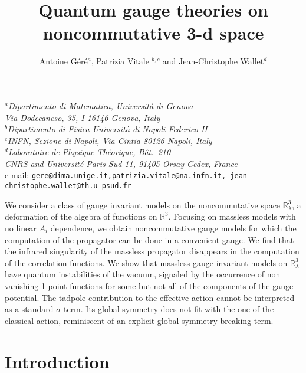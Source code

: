 \documentclass[a4paper,11pt]{article}
\title{Quantum gauge theories on noncommutative 3-d space}
\author{Antoine G\'er\'e$^a$, Patrizia Vitale $^{b,c}$ and Jean-Christophe Wallet$^d$}
\numberwithin{equation}{section}
\theoremstyle{nonumberplain}
\begin{document}
\date{}
\maketitle
\vspace*{-1cm}

\begin{center}
\textit{$^a$Dipartimento di Matematica, Universit\`a di Genova\\Via Dodecaneso, 35, I-16146 Genova, Italy} \\
\textit{$^b$Dipartimento di Fisica
Universit\`a di Napoli Federico II}  \\
\textit{$^c$INFN, Sezione di Napoli, Via Cintia 80126 Napoli, Italy}\\
\smallskip
\textit{$^d$Laboratoire de Physique Th\'eorique, B\^at.\ 210\\
CNRS and Universit\'e Paris-Sud 11,  91405 Orsay Cedex, France}\\
\bigskip
 e-mail:
\texttt{gere@dima.unige.it,patrizia.vitale@na.infn.it, jean-christophe.wallet@th.u-psud.fr}\\[1ex]

\end{center}


\bigskip

We consider a  class of gauge invariant models on the noncommutative space $\mathbb{R}^3_\lambda$, a deformation of the algebra of functions on $\mathbb{R}^3$. Focusing on massless models with no linear $A_i$ dependence, we obtain noncommutative gauge models for which the computation of the propagator can be done in a convenient gauge. We find that the infrared singularity of the massless propagator disappears in the computation of the correlation functions. We show that massless gauge invariant models on $\mathbb{R}^3_\lambda$ have quantum instabilities of the vacuum, signaled by the occurrence of non vanishing 1-point functions for some but not all of the components of the gauge potential. The tadpole contribution to the effective action cannot be interpreted as a standard $\sigma$-term. Its global symmetry does not fit with the one of the classical action, reminiscent of an explicit global symmetry breaking term.
\bigskip


\pagebreak
\section{Introduction}\label{intro}
\end{document}
